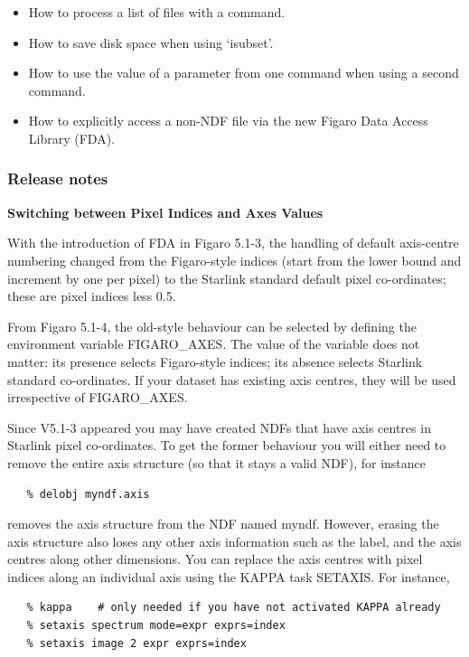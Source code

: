 \documentclass[11pt,twoside]{article}
\begin{document}
\begin{itemize}
\item How to process a list of files with a command.
\item How to save disk space when using `isubset'.
\item How to use the value of a parameter from one command when using
      a second command.
\item How to explicitly access a non-NDF file via the new Figaro
      Data Access Library (FDA).
\end{itemize}

\subsubsection{\label{news514_release_notes}Release notes}

{\bf   Switching between Pixel Indices and Axes Values}

   With the introduction of FDA in Figaro 5.1-3, the handling of
   default axis-centre numbering changed from the Figaro-style
   indices (start from the lower bound and increment by one per
   pixel) to the Starlink standard default pixel co-ordinates;
   these are pixel indices less 0.5.

   From Figaro 5.1-4, the old-style behaviour can be selected by
   defining the environment variable FIGARO\_AXES.  The value of the
   variable does not matter: its presence selects Figaro-style
   indices; its absence selects Starlink standard co-ordinates.  If
   your dataset has existing axis centres, they will be used
   irrespective of FIGARO\_AXES.

   Since V5.1-3 appeared you may have created NDFs that have axis
   centres in Starlink pixel co-ordinates.  To get the former
   behaviour you will either need to remove the entire axis structure
   (so that it stays a valid NDF), for instance

\begin{verbatim}
   % delobj myndf.axis
\end{verbatim}

   removes the axis structure from the NDF named myndf.  However,
   erasing the axis structure also loses any other axis information
   such as the label, and the axis centres along other dimensions.
   You can replace the axis centres with pixel indices along an
   individual axis using the KAPPA task SETAXIS.  For instance,

\begin{verbatim}
   % kappa    # only needed if you have not activated KAPPA already
   % setaxis spectrum mode=expr exprs=index
   % setaxis image 2 expr exprs=index
\end{verbatim}
\end{document}
